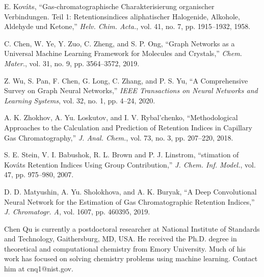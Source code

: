 \documentclass{IEEEcsmag}
\begin{document}
\begin{thebibliography}{1}

E. Kov\'ats, ``Gas-chromatographische Charakterisierung organischer Verbindungen. Teil 1: Retentionsindices aliphatischer Halogenide, Alkohole, Aldehyde und Ketone,'' {\it Helv. Chim. Acta.}, vol. 41, no. 7, pp. 1915--1932, 1958.

C. Chen, W. Ye, Y. Zuo, C. Zheng, and S. P. Ong, ``Graph Networks as a Universal Machine Learning Framework for Molecules and Crystals,'' {\it Chem. Mater.}, vol. 31, no. 9, pp. 3564--3572, 2019.

Z. Wu, S. Pan, F. Chen, G. Long, C. Zhang, and P. S. Yu, ``A Comprehensive Survey on Graph Neural Networks,'' {\it IEEE Transactions on Neural Networks and Learning Systems}, vol. 32, no. 1, pp. 4--24, 2020.

A. K. Zhokhov, A. Yu. Loskutov, and I. V. Rybal’chenko, ``Methodological Approaches to the Calculation and Prediction of Retention Indices in Capillary Gas Chromatography,'' {\it J. Anal. Chem.}, vol. 73, no. 3, pp. 207--220, 2018.

S. E. Stein, V. I. Babushok, R. L. Brown and P. J. Linstrom, ``stimation of {Kov\'ats} Retention Indices Using Group Contribution,'' {\it J. Chem. Inf. Model.}, vol. 47, pp. 975--980, 2007.

D. D. Matyushin, A. Yu. Sholokhova, and A. K. Buryak, ``A Deep Convolutional Neural Network for the Estimation of Gas Chromatographic Retention Indices,'' {\it J. Chromatogr. A}, vol. 1607, pp. 460395, 2019.

\end{thebibliography}


\begin{IEEEbiography}{Chen Qu} is
currently a postdoctoral researcher at National Institute of Standards and Technology, Gaithersburg, MD, USA. He received the Ph.D. degree in theoretical and computational chemistry from Emory University. Much of his work has focused on solving chemistry problems using machine learning. Contact him at cnq1@nist.gov.
\end{IEEEbiography}
\end{document}
